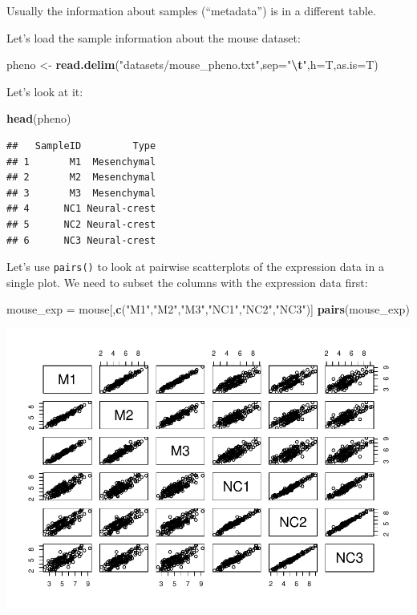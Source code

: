 \documentclass[
]{book}
\newenvironment{Shaded}{\begin{snugshade}}{\end{snugshade}}
\newcommand{\AttributeTok}[1]{\textcolor[rgb]{0.13,0.29,0.53}{#1}}
\newcommand{\FunctionTok}[1]{\textcolor[rgb]{0.13,0.29,0.53}{\textbf{#1}}}
\newcommand{\NormalTok}[1]{#1}
\newcommand{\OtherTok}[1]{\textcolor[rgb]{0.56,0.35,0.01}{#1}}
\newcommand{\SpecialCharTok}[1]{\textcolor[rgb]{0.81,0.36,0.00}{\textbf{#1}}}
\newcommand{\StringTok}[1]{\textcolor[rgb]{0.31,0.60,0.02}{#1}}
\begin{document}
Usually the information about samples (``metadata'') is in a different table.

Let's load the sample information about the mouse dataset:

\begin{Shaded}
\begin{Highlighting}[]
\NormalTok{pheno }\OtherTok{\textless{}{-}} \FunctionTok{read.delim}\NormalTok{(}\StringTok{"datasets/mouse\_pheno.txt"}\NormalTok{,}\AttributeTok{sep=}\StringTok{"}\SpecialCharTok{\textbackslash{}t}\StringTok{"}\NormalTok{,}\AttributeTok{h=}\NormalTok{T,}\AttributeTok{as.is=}\NormalTok{T)}
\end{Highlighting}
\end{Shaded}

Let's look at it:

\begin{Shaded}
\begin{Highlighting}[]
\FunctionTok{head}\NormalTok{(pheno)}
\end{Highlighting}
\end{Shaded}

\begin{verbatim}
##   SampleID         Type
## 1       M1  Mesenchymal
## 2       M2  Mesenchymal
## 3       M3  Mesenchymal
## 4      NC1 Neural-crest
## 5      NC2 Neural-crest
## 6      NC3 Neural-crest
\end{verbatim}

Let's use \texttt{pairs()} to look at pairwise scatterplots of the expression data in a single plot. We need to subset the columns with the expression data first:

\begin{Shaded}
\begin{Highlighting}[]
\NormalTok{mouse\_exp }\OtherTok{=}\NormalTok{ mouse[,}\FunctionTok{c}\NormalTok{(}\StringTok{"M1"}\NormalTok{,}\StringTok{"M2"}\NormalTok{,}\StringTok{"M3"}\NormalTok{,}\StringTok{"NC1"}\NormalTok{,}\StringTok{"NC2"}\NormalTok{,}\StringTok{"NC3"}\NormalTok{)]}
\FunctionTok{pairs}\NormalTok{(mouse\_exp)}
\end{Highlighting}
\end{Shaded}

\includegraphics{_main_files/figure-latex/unnamed-chunk-8-1.pdf}
\end{document}

